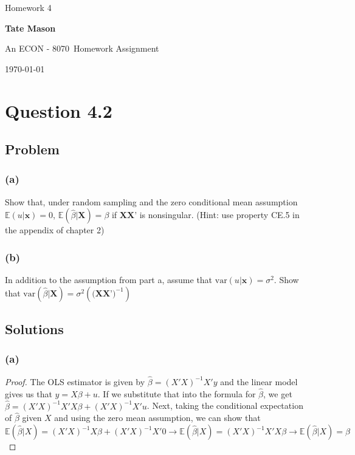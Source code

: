 \documentclass[10pt, a4paper]{article}
\newcommand\course{ECON - 8070}                            %
\newcommand\hwnumber{ 4}                                 %
\newcommand\Information{Tate Mason}                        %
\newcommand{\EE}{\mathbb E}
\newcommand{\var}{\text{var}}
\begin{document}
  \begin{titlepage}
    \begin{center}
      \vspace*{3cm}
            
        \vspace{1cm}
        \huge
        Homework \hwnumber
            
        \vspace{1.5cm}
        \Large
            
        \textbf{\Information}                      %
            
        \vfill
        
        An \course \ Homework Assignment
            
        \vspace{1cm}
        \Large
        
        \today
            
    \end{center}
  \end{titlepage}

  \newpage
  \section*{Question 4.2}
    \subsection*{Problem}
      \subsubsection*{(a)}
        Show that, under random sampling and the zero conditional mean assumption $\EE(u|\textbf{x})=0$, $\EE(\hat{\beta}|\textbf{X})=\beta$ if $\textbf{XX'}$ is nonsingular. (Hint: use property CE.5 in the appendix of chapter 2)
      \subsubsection*{(b)}
        In addition to the assumption from part a, assume that $\var(u|\textbf{x}) = \sigma^2$. Show that $\var(\hat{\beta}|\textbf{X}) = \sigma^2(\textbf{(XX')}^{-1})$
    \subsection*{Solutions}
      \subsubsection*{(a)}
        \begin{proof}
          The OLS estimator is given by $\hat{\beta} = (X'X)^{-1}X'y$ and the linear model gives us that $y = X\beta + u$. If we substitute that into the formula for $\hat{\beta}$, we get $\hat{\beta} = (X'X)^{-1}X'X\beta + (X'X)^{-1}X'u$. Next, taking the conditional expectation of $\hat{\beta}$ given $X$ and using the zero mean assumption, we can show that $\EE(\hat{\beta}|X) = (X'X)^{-1}X\beta + (X'X)^{-1}X'0 \rightarrow \EE(\hat{\beta}|X) = (X'X)^{-1}X'X\beta \rightarrow \EE({\hat{\beta}|X}) = \beta$ 
        \end{proof}
\end{document}
